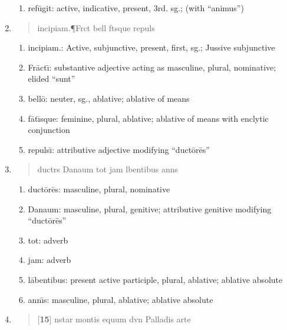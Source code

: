 \documentclass[]{article}
\newcommand{\latify}[1]{
        \Large
        \begin{verse}
          \begin{metrica}
          {#1}\\
          \end{metrica}
        \end{verse}
        \normalsize
}
\begin{document}
\begin{enumerate}
\begin{enumerate}
	\item ref\={u}git: active, indicative, present, 3rd. sg.; (with ``animus'')

\end{enumerate}

\item \latify{incipiam.{\P}Fr{}ct{\macron {\i}} bell{\macron {o}} f{\macron {a}}t{\macron {\i}}sque repuls{\macron {\i}}}
\begin{enumerate}

	\item incipiam.:   Active, subjunctive, present, first, sg.; Jussive subjunctive

	\item Fr\={a}ct\={\i}:  substantive adjective acting as masculine, plural, nominative; elided ``sunt''

	\item bell\={o}:  neuter, sg., ablative; ablative of means

	\item f\={a}t\={\i}sque: feminine, plural, ablative; ablative of means with enclytic conjunction

	\item repuls\={\i}:  attributive adjective modifying ``duct\={o}r\={e}s''

\end{enumerate}

\item \latify{duct{}r{}s Danaum tot jam l{\macron {a}}bentibus ann{\macron {\i}}s}
\begin{enumerate}

	\item duct\={o}r\={e}s:  masculine, plural, nominative

	\item Danaum: masculine, plural, genitive; attributive genitive modifying ``duct\={o}r\={e}s''

	\item tot:  adverb

	\item jam: adverb

	\item l\={a}bentibus: present active participle, plural, ablative; ablative absolute

	\item ann\={\i}s:  masculine, plural, ablative; ablative absolute
\end{enumerate}


\item \latify{[\textbf{15}] {\macron {\i}}nstar montis equum d{\macron {\i}}v{\macron {\i}}n{\macron {a}} Palladis arte}     
\begin{enumerate}


\end{enumerate}
\end{enumerate}
\end{document}
